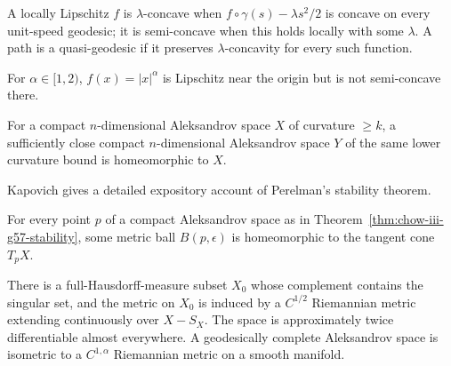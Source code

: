 \begin{definition}
\label{def:chow-iii-g54-g56-semi-concavity}
A locally Lipschitz $f$ is $\lambda$-concave when
$f\circ\gamma(s)-\lambda s^2/2$ is concave on every unit-speed geodesic; it is
semi-concave when this holds locally with some $\lambda$.  A path is a
quasi-geodesic if it preserves $\lambda$-concavity for every such function.
\end{definition}

\begin{example}
\label{ex:chow-iii-g55-power-function}
For $\alpha\in[1,2)$, $f(x)=|x|^\alpha$ is Lipschitz near the origin but is
not semi-concave there.
\end{example}

\begin{theorem}
\label{thm:chow-iii-g57-stability}
For a compact $n$-dimensional Aleksandrov space $X$ of curvature $\geq k$, a
sufficiently close compact $n$-dimensional Aleksandrov space $Y$ of the same
lower curvature bound is homeomorphic to $X$.
\end{theorem}

\begin{remark}
\label{rem:chow-iii-g58-stability-reference}
Kapovich gives a detailed expository account of Perelman's stability theorem.
\end{remark}

\begin{corollary}
\label{cor:chow-iii-g59-small-balls}
For every point $p$ of a compact Aleksandrov space as in Theorem~\ref{thm:chow-iii-g57-stability},
some metric ball $B(p,\epsilon)$ is homeomorphic to the tangent cone $T_pX$.
\end{corollary}

\begin{theorem}
\label{thm:chow-iii-g60-regularity}
There is a full-Hausdorff-measure subset $X_0$ whose complement contains the
singular set, and the metric on $X_0$ is induced by a $C^{1/2}$ Riemannian
metric extending continuously over $X-S_X$.  The space is approximately twice
differentiable almost everywhere.  A geodesically complete Aleksandrov space
is isometric to a $C^{1,\alpha}$ Riemannian metric on a smooth manifold.
\end{theorem}
